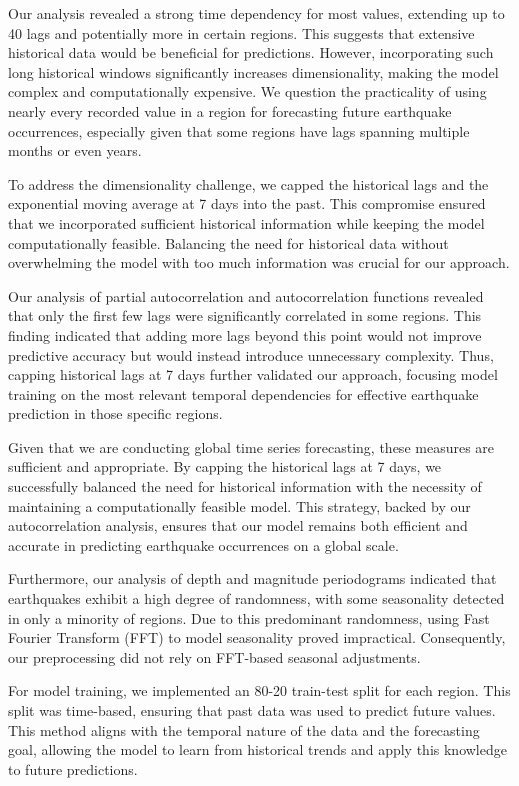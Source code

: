 Our analysis revealed a strong time dependency for most values, extending up to 40 lags and potentially more in certain regions. This suggests that extensive historical data would be beneficial for predictions. However, incorporating such long historical windows significantly increases dimensionality, making the model complex and computationally expensive. We question the practicality of using nearly every recorded value in a region for forecasting future earthquake occurrences, especially given that some regions have lags spanning multiple months or even years.

To address the dimensionality challenge, we capped the historical lags and the exponential moving average at 7 days into the past. This compromise ensured that we incorporated sufficient historical information while keeping the model computationally feasible. Balancing the need for historical data without overwhelming the model with too much information was crucial for our approach.

Our analysis of partial autocorrelation and autocorrelation functions revealed that only the first few lags were significantly correlated in some regions. This finding indicated that adding more lags beyond this point would not improve predictive accuracy but would instead introduce unnecessary complexity. Thus, capping historical lags at 7 days further validated our approach, focusing model training on the most relevant temporal dependencies for effective earthquake prediction in those specific regions.

Given that we are conducting global time series forecasting, these measures are sufficient and appropriate. By capping the historical lags at 7 days, we successfully balanced the need for historical information with the necessity of maintaining a computationally feasible model. This strategy, backed by our autocorrelation analysis, ensures that our model remains both efficient and accurate in predicting earthquake occurrences on a global scale.

Furthermore, our analysis of depth and magnitude periodograms indicated that earthquakes exhibit a high degree of randomness, with some seasonality detected in only a minority of regions. Due to this predominant randomness, using Fast Fourier Transform (FFT) to model seasonality proved impractical. Consequently, our preprocessing did not rely on FFT-based seasonal adjustments.

For model training, we implemented an 80-20 train-test split for each region. This split was time-based, ensuring that past data was used to predict future values. This method aligns with the temporal nature of the data and the forecasting goal, allowing the model to learn from historical trends and apply this knowledge to future predictions.

